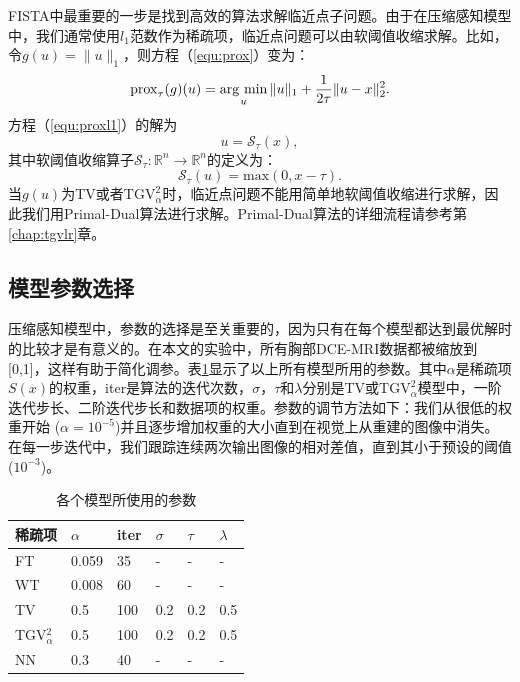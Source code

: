 FISTA中最重要的一步是找到高效的算法求解临近点子问题。由于在压缩感知模型中，我们通常使用$l_1$范数作为稀疏项，临近点问题可以由软阈值收缩求解。比如，令$g(u) = \|u\|_1$，则方程（\ref{equ:prox}）变为：
\begin{equation}
\prox_\tau(g)(u)=\argmin_u{\|u\|_1+\frac{1}{2\tau}}\|u-x\|_2^2.
\label{equ:proxl1}
\end{equation}
方程（\ref{equ:proxl1}）的解为
\begin{equation}
u=\mathscr{S}_{\tau}(x),
\end{equation}
其中软阈值收缩算子$\mathscr{S}_{\tau}:\mathbb{R}^n\xrightarrow{} \mathbb{R}^n$的定义为：
\begin{equation}
\mathscr{S}_{\tau}(u)=
\mathrm{max}(0, x-\tau).
\end{equation}
当$g(u)$为TV或者$\mathrm{TGV}_\alpha^2$时，临近点问题不能用简单地软阈值收缩进行求解，因此我们用Primal-Dual算法进行求解。Primal-Dual算法的详细流程请参考第\ref{chap:tgvlr}章。

\subsection{模型参数选择}
压缩感知模型中，参数的选择是至关重要的，因为只有在每个模型都达到最优解时的比较才是有意义的。在本文的实验中，所有胸部DCE-MRI数据都被缩放到[0,1]，这样有助于简化调参。表\ref{tab:params4}显示了以上所有模型所用的参数。其中$\alpha$是稀疏项$S(x)$的权重，iter是算法的迭代次数，$\sigma$，$\tau$和$\lambda$分别是TV或$\mathrm{TGV}_\alpha^2$模型中，一阶迭代步长、二阶迭代步长和数据项的权重。参数的调节方法如下：我们从很低的权重开始 ($\alpha=10^{-5}$)并且逐步增加权重的大小直到在视觉上从重建的图像中消失。在每一步迭代中，我们跟踪连续两次输出图像的相对差值，直到其小于预设的阈值 ($10^{-3}$)。

\begin{table}
\setlength{\belowcaptionskip}{10pt}
\caption{各个模型所使用的参数}
\centering
\begin{tabular}{|l|l|l|l|l|l|}
\hline
\hline
稀疏项 & $\alpha$ & iter & $\sigma$ & $\tau$ & $\lambda$\\
\hline
FT & 0.059 & 35 & - & - & -\\
\hline
WT & 0.008 & 60 & - & - & -\\
\hline
TV & 0.5 & 100 & 0.2 & 0.2 & 0.5\\
\hline
TGV$_{\alpha}^2$ & 0.5 & 100 & 0.2 & 0.2 & 0.5\\
\hline
NN & 0.3 & 40 & - & - & -\\
\hline
\end{tabular}
\label{tab:params4}
\end{table}

